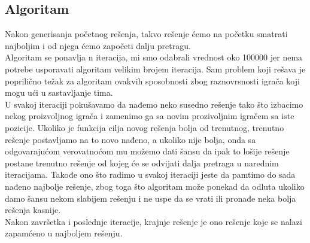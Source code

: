 \documentclass[a4paper]{article}
\begin{document}
\subsection{Algoritam}
Nakon generisanja početnog rešenja, takvo rešenje ćemo na početku smatrati najboljim i od njega ćemo započeti dalju pretragu. \\
Algoritam se ponavlja n iteracija, mi smo odabrali vrednost oko 100000 jer nema potrebe usporavati algoritam velikim brojem iteracija. Sam problem koji rešava je poprilično težak za algoritam ovakvih sposobnosti zbog raznovrsnosti igrača koji mogu ući u sastavljanje tima. \\
U svakoj iteraciji pokušavamo da nađemo neko susedno rešenje tako što izbacimo nekog proizvoljnog igrača i zamenimo ga sa novim prozivoljnim igračem sa iste pozicije. Ukoliko je funkcija cilja novog rešenja bolja od trenutnog, trenutno rešenje postavljamo na to novo nađeno, a ukoliko nije bolja, onda sa odgovarajućom verovatnoćom mu možemo dati šansu da ipak to lošije rešenje postane trenutno rešenje od kojeg će se odvijati dalja pretraga u narednim iteracijama. Takođe ono što radimo u svakoj iteraciji jeste da pamtimo do sada nađeno najbolje rešenje, zbog toga što algoritam može ponekad da odluta ukoliko damo šansu nekom slabijem rešenju i ne uspe da se vrati ili pronađe neka bolja rešenja kasnije. \\
Nakon završetka i poslednje iteracije, krajnje rešenje je ono rešenje koje se nalazi zapamćeno u najboljem rešenju.





\end{document}
